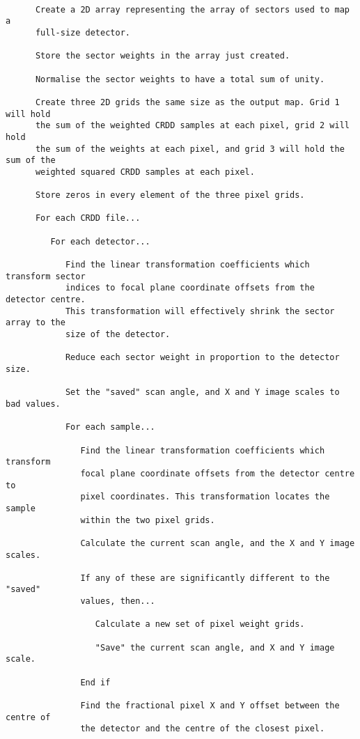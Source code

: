 \begin{verbatim}

      Create a 2D array representing the array of sectors used to map a
      full-size detector.

      Store the sector weights in the array just created.

      Normalise the sector weights to have a total sum of unity.

      Create three 2D grids the same size as the output map. Grid 1 will hold
      the sum of the weighted CRDD samples at each pixel, grid 2 will hold
      the sum of the weights at each pixel, and grid 3 will hold the sum of the
      weighted squared CRDD samples at each pixel.

      Store zeros in every element of the three pixel grids.

      For each CRDD file...

         For each detector...

            Find the linear transformation coefficients which transform sector
            indices to focal plane coordinate offsets from the detector centre.
            This transformation will effectively shrink the sector array to the
            size of the detector.

            Reduce each sector weight in proportion to the detector size.

            Set the "saved" scan angle, and X and Y image scales to bad values.

            For each sample...

               Find the linear transformation coefficients which transform
               focal plane coordinate offsets from the detector centre to
               pixel coordinates. This transformation locates the sample
               within the two pixel grids.

               Calculate the current scan angle, and the X and Y image scales.

               If any of these are significantly different to the "saved"
               values, then...

                  Calculate a new set of pixel weight grids.

                  "Save" the current scan angle, and X and Y image scale.

               End if

               Find the fractional pixel X and Y offset between the centre of
               the detector and the centre of the closest pixel.


\end{verbatim}
